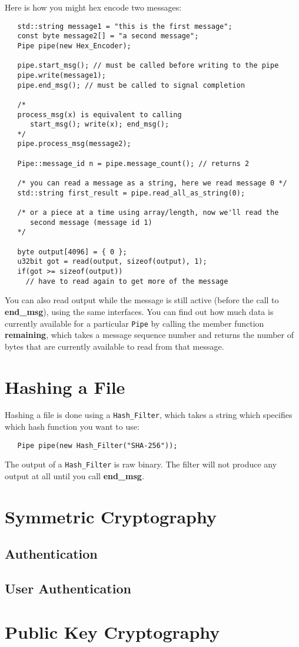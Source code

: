\documentclass{article}
\newcommand{\function}[1]{\textbf{#1}}
\newcommand{\type}[1]{\texttt{#1}}
\begin{document}
Here is how you might hex encode two messages:

\begin{verbatim}
   std::string message1 = "this is the first message";
   const byte message2[] = "a second message";
   Pipe pipe(new Hex_Encoder);

   pipe.start_msg(); // must be called before writing to the pipe
   pipe.write(message1);
   pipe.end_msg(); // must be called to signal completion

   /*
   process_msg(x) is equivalent to calling
      start_msg(); write(x); end_msg();
   */
   pipe.process_msg(message2);

   Pipe::message_id n = pipe.message_count(); // returns 2

   /* you can read a message as a string, here we read message 0 */
   std::string first_result = pipe.read_all_as_string(0);

   /* or a piece at a time using array/length, now we'll read the
      second message (message id 1)
   */

   byte output[4096] = { 0 };
   u32bit got = read(output, sizeof(output), 1);
   if(got >= sizeof(output))
     // have to read again to get more of the message
\end{verbatim}

You can also read output while the message is still active (before the
call to \function{end\_msg}), using the same interfaces. You can find
out how much data is currently available for a particular \type{Pipe}
by calling the member function \function{remaining}, which takes a
message sequence number and returns the number of bytes that are
currently available to read from that message.

\section{Hashing a File}

Hashing a file is done using a \type{Hash\_Filter}, which takes a string
which specifies which hash function you want to use:

\begin{verbatim}
   Pipe pipe(new Hash_Filter("SHA-256"));
\end{verbatim}

The output of a \type{Hash\_Filter} is raw binary. The filter will not
produce any output at all until you call \function{end\_msg}.

\section{Symmetric Cryptography}



\subsection{Authentication}

\subsection{User Authentication}

\section{Public Key Cryptography}
\end{document}
